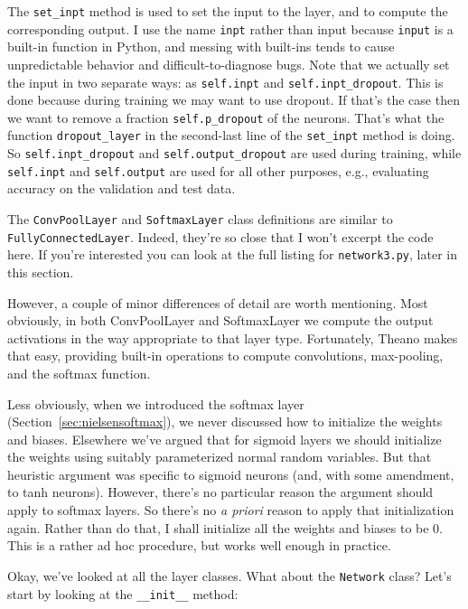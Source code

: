 The \lstinline{set_inpt} method is used to set the input to the layer, and to compute the corresponding output. I use the name \lstinline{inpt} rather than input because \lstinline{input} is a built-in function in Python, and messing with built-ins tends to cause unpredictable behavior and difficult-to-diagnose bugs. Note that we actually set the input in two separate ways: as \lstinline{self.inpt} and \lstinline{self.inpt_dropout}. This is done because during training we may want to use dropout. If that's the case then we want to remove a fraction \lstinline{self.p_dropout} of the neurons. That's what the function \lstinline{dropout_layer} in the second-last line of the \lstinline{set_inpt} method is doing. So \lstinline{self.inpt_dropout} and \lstinline{self.output_dropout} are used during training, while \lstinline{self.inpt} and \lstinline{self.output} are used for all other purposes, e.g., evaluating accuracy on the validation and test data.

The \lstinline{ConvPoolLayer} and \lstinline{SoftmaxLayer} class definitions are similar to \lstinline{FullyConnectedLayer}. Indeed, they're so close that I won't excerpt the code here. If you're interested you can look at the full listing for \lstinline{network3.py}, later in this section.

However, a couple of minor differences of detail are worth mentioning. Most obviously, in both ConvPoolLayer and SoftmaxLayer we compute the output activations in the way appropriate to that layer type. Fortunately, Theano makes that easy, providing built-in operations to compute convolutions, max-pooling, and the softmax function.

Less obviously, when we introduced the softmax layer (Section~\ref{sec:nielsensoftmax}), we never discussed how to initialize the weights and biases. Elsewhere we've argued that for sigmoid layers we should initialize the weights using suitably parameterized normal random variables. But that heuristic argument was specific to sigmoid neurons (and, with some amendment, to tanh neurons). However, there's no particular reason the argument should apply to softmax layers. So there's no \textit{a priori} reason to apply that initialization again. Rather than do that, I shall initialize all the weights and biases to be 0. This is a rather ad hoc procedure, but works well enough in practice.

Okay, we've looked at all the layer classes. What about the \lstinline{Network} class? Let's start by looking at the \lstinline{__init__} method:

